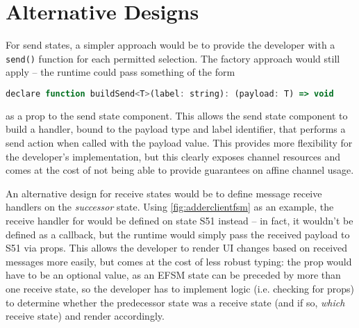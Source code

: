 \section{Alternative Designs}

For send states, a simpler approach would be
to provide the developer with a \texttt{send()} function 
for each permitted selection.
The factory approach would still apply -- the runtime could pass something
of the form

\begin{lstlisting}[language=javascript, numbers=none]
declare function buildSend<T>(label: string): (payload: T) => void
\end{lstlisting}

as a prop to the send state component.
This allows the send state component to build a handler,
bound to the payload type and label identifier, that performs a 
send action when called with the payload value.
This provides more flexibility for the developer's implementation,
but this clearly exposes channel resources and 
comes at the cost of not being able to provide guarantees
on affine channel usage.

An alternative design for receive states
would be to define message receive handlers on the
\textit{successor} state.
Using \cref{fig:adderclientfsm} as an example,
the receive handler for 
would be defined on state S51 instead -- in fact, it wouldn't
be defined as a callback, but the runtime would simply pass
the received payload to S51 via props.
This allows the developer to render UI changes
based on received messages more easily, but comes at the
cost of less robust typing:
the  prop would have to be an optional value,
as an EFSM state can be preceded by more than one receive state,
so the developer has to implement logic (i.e. checking
for  props) to determine whether
the predecessor state was a receive state (and if so,
\textit{which} receive state) and render accordingly.